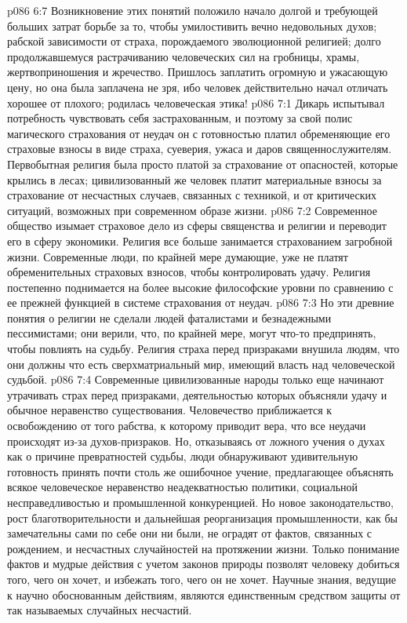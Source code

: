 \vs p086 6:7 Возникновение этих понятий положило начало долгой и требующей больших затрат борьбе за то, чтобы умилостивить вечно недовольных духов; рабской зависимости от страха, порождаемого эволюционной религией; долго продолжавшемуся растрачиванию человеческих сил на гробницы, храмы, жертвоприношения и жречество. Пришлось заплатить огромную и ужасающую цену, но она была заплачена не зря, ибо человек действительно начал отличать хорошее от плохого; родилась человеческая этика!
\vs p086 7:1 Дикарь испытывал потребность чувствовать себя застрахованным, и поэтому за свой полис магического страхования от неудач он с готовностью платил обременяющие его страховые взносы в виде страха, суеверия, ужаса и даров священнослужителям. Первобытная религия была просто платой за страхование от опасностей, которые крылись в лесах; цивилизованный же человек платит материальные взносы за страхование от несчастных случаев, связанных с техникой, и от критических ситуаций, возможных при современном образе жизни.
\vs p086 7:2 Современное общество изымает страховое дело из сферы священства и религии и переводит его в сферу экономики. Религия все больше занимается страхованием загробной жизни. Современные люди, по крайней мере думающие, уже не платят обременительных страховых взносов, чтобы контролировать удачу. Религия постепенно поднимается на более высокие философские уровни по сравнению с ее прежней функцией в системе страхования от неудач.
\vs p086 7:3 Но эти древние понятия о религии не сделали людей фаталистами и безнадежными пессимистами; они верили, что, по крайней мере, могут что\hyp{}то предпринять, чтобы повлиять на судьбу. Религия страха перед призраками внушила людям, что они должны  что есть сверхматриальный мир, имеющий власть над человеческой судьбой.
\vs p086 7:4 Современные цивилизованные народы только еще начинают утрачивать страх перед призраками, деятельностью которых объясняли удачу и обычное неравенство существования. Человечество приближается к освобождению от того рабства, к которому приводит вера, что все неудачи происходят из\hyp{}за духов\hyp{}призраков. Но, отказываясь от ложного учения о духах как о причине превратностей судьбы, люди обнаруживают удивительную готовность принять почти столь же ошибочное учение, предлагающее объяснять всякое человеческое неравенство неадекватностью политики, социальной несправедливостью и промышленной конкуренцией. Но новое законодательство, рост благотворительности и дальнейшая реорганизация промышленности, как бы замечательны сами по себе они ни были, не оградят от фактов, связанных с рождением, и несчастных случайностей на протяжении жизни. Только понимание фактов и мудрые действия с учетом законов природы позволят человеку добиться того, чего он хочет, и избежать того, чего он не хочет. Научные знания, ведущие к научно обоснованным действиям, являются единственным средством защиты от так называемых случайных несчастий.
